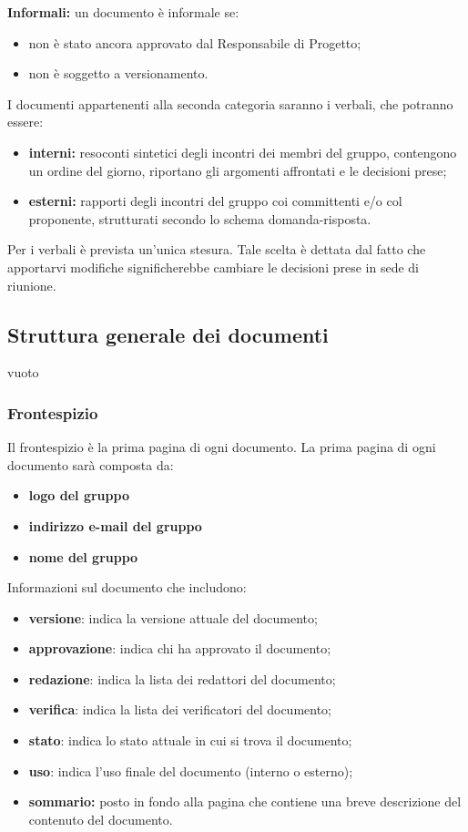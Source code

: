  \textbf{Informali:} un documento è informale se:
\begin{itemize}
\item non è stato ancora approvato dal Responsabile di Progetto;
	\item non è soggetto a versionamento.
\end{itemize}
I documenti appartenenti alla seconda categoria saranno i verbali, che potranno
essere:
\begin{itemize}
\item \textbf{interni:} resoconti sintetici degli incontri dei membri del gruppo, contengono un ordine del giorno, riportano gli argomenti affrontati e le decisioni prese;
	\item \textbf{esterni:} rapporti degli incontri del gruppo coi committenti e/o col proponente, strutturati secondo lo schema domanda-risposta.
\end{itemize}
Per i verbali è prevista un’unica stesura. Tale scelta è dettata dal fatto che apportarvi modifiche significherebbe cambiare le decisioni prese in sede di riunione.
\\
\subsection{Struttura generale dei documenti}
{vuoto}
\subsubsection{Frontespizio}
Il frontespizio è la prima pagina di ogni documento. 
La prima pagina di ogni documento sarà composta da:
\begin{itemize}
	\item \textbf{logo del gruppo}
		\item \textbf{indirizzo e-mail del gruppo}
			\item \textbf{nome del gruppo}
\end{itemize}
Informazioni sul documento che includono:
\begin{itemize}
	\item \textbf{versione}: indica la versione attuale del documento;
		\item \textbf{approvazione}: indica chi ha approvato il documento;
			\item \textbf{redazione}: indica la lista dei redattori del documento;
				\item \textbf{verifica}: indica la lista dei verificatori del documento; 
					\item \textbf{stato}: indica lo stato attuale in cui si trova il documento;
						\item \textbf{uso}: indica l’uso finale del documento (interno o esterno); 
							\item \textbf{sommario:} posto in fondo alla pagina che contiene una breve descrizione del contenuto del documento.
\end{itemize}

